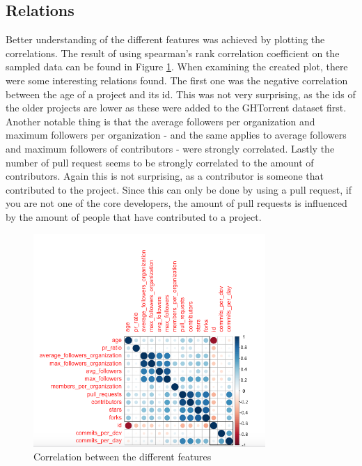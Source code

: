     \subsection{Relations}
    Better understanding of the different features was achieved by plotting the correlations.
    The result of using spearman's rank correlation coefficient  on the sampled data can be found in Figure \ref{fig:correlation-plot}.
    When examining the created plot, there were some interesting relations found.
    The first one was the negative correlation between the age of a project and its id.
    This was not very surprising, as the ids of the older projects are lower as these were added to the GHTorrent dataset first.
    Another notable thing is that the average followers per organization and maximum followers per organization - and the same applies to average followers and maximum followers of contributors - were strongly correlated. 
    Lastly the number of pull request seems to be strongly correlated to the amount of contributors.
    Again this is not surprising, as a contributor is someone that contributed to the project. 
    Since this can only be done by using a pull request, if you are not one of the core developers, the amount of pull requests is influenced by the amount of people that have contributed to a project.
    \begin{figure}[h!]
	    \includegraphics[width=250pt]{figures/correlation}
	    \caption{Correlation between the different features}
        \label{fig:correlation-plot}
	\end{figure}

